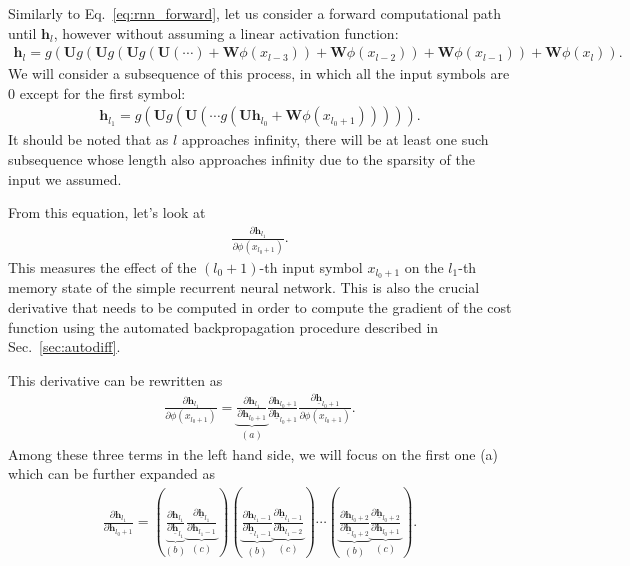 \documentclass{report}
\newcommand{\vect}[1]{\mathbf{#1}}
\newcommand{\matr}[1]{\mathbf{#1}}
\newcommand{\vh}[0]{\vect{h}}
\newcommand{\mW}[0]{\matr{W}}
\newcommand{\mU}[0]{\matr{U}}
\begin{document}
Similarly to Eq.~\eqref{eq:rnn_forward}, let us consider a forward computational
path until $\vh_l$, however without assuming a linear activation function:
\begin{align*}
    \vh_l = g\left(\mU g\left(\mU g\left(\mU g\left(\mU \left( \cdots \right)
                + \mW \phi\left(x_{l-3}\right)\right) + \mW
        \phi\left(x_{l-2}\right)\right)+\mW \phi\left(x_{l-1}\right)\right) +
    \mW\phi\left(x_{l}\right)\right).
\end{align*}
We will consider a subsequence of this process, in which all the input symbols
are $0$ except for the first symbol:
\begin{align*}
    \vh_{l_1} = g\left(\mU g\left(\mU \left( \cdots g\left(\mU \vh_{l_0} + \mW
    \phi\left(x_{l_0+1}\right)\right)\right)\right)\right).
\end{align*}
It should be noted that as $l$ approaches
infinity, there will be at least one such subsequence whose length also
approaches infinity due to the sparsity of the input we assumed.

From this equation, let's look at 
\begin{align*}
    \frac{\partial \vh_{l_1}}{\partial \phi\left(x_{l_0+1}\right)}.
\end{align*}
This measures the effect of the $(l_0+1)$-th input symbol $x_{l_0+1}$ on the
$l_1$-th memory state of the simple recurrent neural network. This is also the
crucial derivative that needs to be computed in order to compute the gradient of
the cost function using the automated backpropagation procedure described in
Sec.~\ref{sec:autodiff}.

This derivative can be rewritten as
\begin{align*}
    \frac{\partial \vh_{l_1}}{\partial \phi\left(x_{l_0+1}\right)} = 
    \underbrace{\frac{\partial \vh_{l_1}}{\partial
    \vh_{l_0+1}}}_{(a)}
    \frac{\partial \vh_{l_0+1}}{\partial \underline{\vh}_{l_0+1}}
    \frac{\partial \underline{\vh}_{l_0+1}}{\partial
    \phi\left(x_{l_0+1}\right)}.
\end{align*}
Among these three terms in the left hand side, we will focus on the first one
(a) which can be further expanded as
\begin{align}
    \label{eq:tderiv}
    \frac{\partial \vh_{l_1}}{\partial \vh_{l_0+1}} = 
    \left(
    \underbrace{\frac{\partial \vh_{l_1}}{\partial \underline{\vh}_{l_1}}}_{(b)}
    \underbrace{\frac{\partial \underline{\vh}_{l_1}}{\partial \vh_{l_1-1}}}_{(c)}
\right)
\left(
    \underbrace{\frac{\partial \vh_{l_1-1}}{\partial
    \underline{\vh}_{l_1-1}}}_{(b)}
        \underbrace{\frac{\partial \underline{\vh}_{l_1-1}}{\partial
        \vh_{l_1-2}}}_{(c)}
\right)
    \cdots
\left(
    \underbrace{\frac{\partial \vh_{l_0+2}}{\partial
    \underline{\vh}_{l_0+2}}}_{(b)}
        \underbrace{\frac{\partial \underline{\vh}_{l_0+2}}{\partial
        \vh_{l_0+1}}}_{(c)}
    \right).
\end{align}
\end{document}
